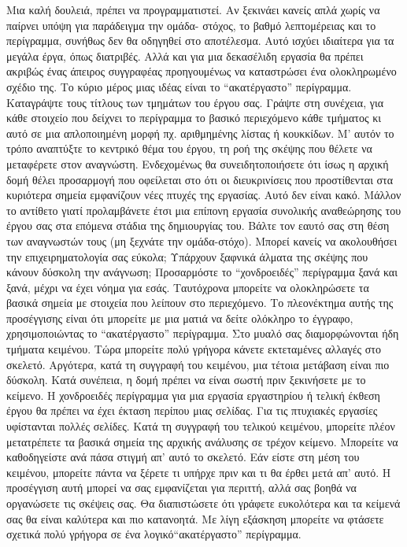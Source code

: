 Μια καλή δουλειά, πρέπει να προγραμματιστεί. Αν ξεκινάει κανείς απλά χωρίς να παίρνει υπόψη για παράδειγμα την ομάδα- στόχος, το βαθμό λεπτομέρειας και το περίγραμμα, συνήθως δεν θα οδηγηθεί στο αποτέλεσμα. Αυτό ισχύει ιδιαίτερα για τα μεγάλα έργα, όπως διατριβές. Αλλά και για μια δεκασέλιδη εργασία θα πρέπει ακριβώς ένας άπειρος συγγραφέας προηγουμένως να καταστρώσει ένα ολοκληρωμένο σχέδιο της.
Το κύριο μέρος μιας ιδέας είναι το “ακατέργαστο” περίγραμμα. Καταγράψτε τους τίτλους των τμημάτων του έργου σας. Γράψτε στη συνέχεια, για κάθε στοιχείο που δείχνει το περίγραμμα το βασικό περιεχόμενο κάθε τμήματος κι αυτό σε μια απλοποιημένη μορφή πχ. αριθμημένης λίστας ή κουκκίδων. Μ' αυτόν το τρόπο αναπτύξτε το κεντρικό θέμα του έργου, τη ροή της σκέψης που θέλετε να μεταφέρετε στον αναγνώστη. Ενδεχομένως θα συνειδητοποιήσετε ότι ίσως η αρχική δομή θέλει προσαρμογή που οφείλεται στο ότι οι διευκρινίσεις που προστίθενται στα κυριότερα σημεία εμφανίζουν νέες πτυχές της εργασίας. Αυτό δεν είναι κακό. Μάλλον το αντίθετο γιατί προλαμβάνετε έτσι μια επίπονη εργασία συνολικής αναθεώρησης του έργου σας στα επόμενα στάδια της δημιουργίας του.
Βάλτε τον εαυτό σας στη θέση των αναγνωστών τους (μη ξεχνάτε την ομάδα-στόχο). Μπορεί κανείς να ακολουθήσει την επιχειρηματολογία σας εύκολα; Υπάρχουν ξαφνικά άλματα της σκέψης που κάνουν δύσκολη την ανάγνωση; Προσαρμόστε το ``χονδροειδές'' περίγραμμα ξανά και ξανά, μέχρι να έχει νόημα για εσάς. Ταυτόχρονα μπορείτε να ολοκληρώσετε τα βασικά σημεία με στοιχεία που λείπουν στο περιεχόμενο.
Το πλεονέκτημα αυτής της προσέγγισης είναι ότι μπορείτε με μια ματιά να δείτε ολόκληρο το έγγραφο, χρησιμοποιώντας το “ακατέργαστο” περίγραμμα. Στο μυαλό σας διαμορφώνονται ήδη τμήματα κειμένου. Τώρα μπορείτε πολύ γρήγορα κάνετε εκτεταμένες αλλαγές στο σκελετό. Αργότερα, κατά τη συγγραφή του κειμένου, μια τέτοια μετάβαση είναι πιο δύσκολη. Κατά συνέπεια, η δομή πρέπει να είναι σωστή πριν ξεκινήσετε με το κείμενο. Η χονδροειδές  περίγραμμα για μια εργασία εργαστηρίου ή τελική έκθεση έργου θα πρέπει να έχει έκταση περίπου μιας σελίδας. Για τις πτυχιακές εργασίες υφίστανται πολλές σελίδες.
Κατά τη συγγραφή του τελικού κειμένου, μπορείτε πλέον μετατρέπετε τα βασικά σημεία της αρχικής ανάλυσης σε τρέχον κείμενο. Μπορείτε να καθοδηγείστε ανά πάσα στιγμή απ' αυτό το σκελετό. Εάν είστε στη μέση του κειμένου, μπορείτε πάντα να ξέρετε τι υπήρχε πριν και τι θα έρθει μετά απ' αυτό.
Η προσέγγιση αυτή μπορεί να σας  εμφανίζεται για περιττή, αλλά σας βοηθά να οργανώσετε τις σκέψεις σας. Θα διαπιστώσετε ότι γράφετε ευκολότερα και τα κείμενά σας θα είναι καλύτερα και πιο κατανοητά. Με λίγη εξάσκηση μπορείτε να φτάσετε σχετικά πολύ γρήγορα σε ένα λογικό“ακατέργαστο” περίγραμμα.
